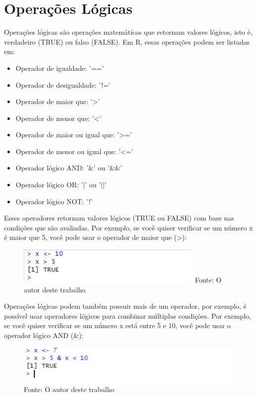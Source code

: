     \section{Opera\c{c}\~{o}es L\'{o}gicas}
    Operações lógicas são operações matemáticas que retornam valores lógicos, isto é, verdadeiro (TRUE) ou falso (FALSE). Em R, essas operações podem ser listadas em:\begin{itemize}
    	\item Operador de igualdade: '=='
    	\item Operador de desigualdade: '!='
    	\item Operador de maior que: '>'
    	\item Operador de menor que: '<'
    	\item Operador de maior ou igual que: '>='
    	\item Operador de menor ou igual que: '<='
    	\item Operador lógico AND: '\&' ou '\&\&'
    	\item Operador lógico OR: '|' ou '||'
    	\item Operador lógico NOT: '!'
    \end{itemize}
	Esses operadores retornam valores lógicos (TRUE ou FALSE) com base nas condições que são avaliadas. Por exemplo, se você quiser verificar se um número x é maior que 5, você pode usar o operador de maior que (>):\begin{figure}[H]
		\centering
		\caption{}
		\includegraphics[width=0.7\linewidth]{Prints/screenshot007}
		\label{fig:screenshot007}
		{\tiny \sf Fonte: O autor deste trabalho }
	\end{figure}
	Operações lógicas podem também possuir mais de um operador, por exemplo, é possível usar operadores lógicos para combinar múltiplas condições. Por exemplo, se você quiser verificar se um número x está entre 5 e 10, você pode usar o operador lógico AND (\&):\begin{figure}[H]
		\centering
		\caption{}
		\includegraphics[width=0.7\linewidth]{Prints/screenshot008}
		\label{fig:screenshot008}
		{\tiny \sf Fonte: O autor deste trabalho }
	\end{figure}
	



